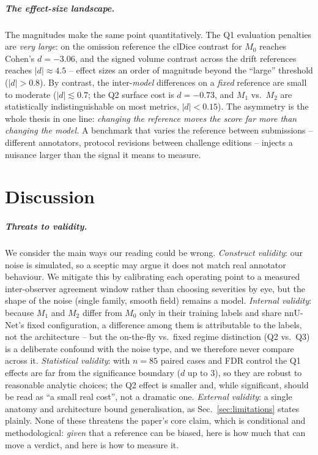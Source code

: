 \documentclass[
    bookmarks, bookmarksnumbered, bookmarksopen,
    colorlinks=true, citecolor=blue, linkcolor=blue, urlcolor=blue
]{techrep}
\begin{document}
\paragraph{The effect-size landscape.} The magnitudes make the same point quantitatively. The
Q1 evaluation penalties are \emph{very large}: on the omission reference the clDice contrast for
$M_0$ reaches Cohen's $d{=}{-}3.06$, and the signed volume contrast across the drift references
reaches $|d|\!\approx\!4.5$ -- effect sizes an order of magnitude beyond the ``large'' threshold
($|d|{>}0.8$). By contrast, the inter-\emph{model} differences on a \emph{fixed} reference are
small to moderate ($|d|\!\lesssim\!0.7$; the Q2 surface cost is $d{=}{-}0.73$, and $M_1$ vs.\
$M_2$ are statistically indistinguishable on most metrics, $|d|{<}0.15$). The asymmetry is the
whole thesis in one line: \emph{changing the reference moves the score far more than changing the
model.} A benchmark that varies the reference between submissions -- different annotators,
protocol revisions between challenge editions -- injects a nuisance larger than the signal it
means to measure.

\chapter{Discussion}\label{sec:discussion}
\paragraph{Threats to validity.} We consider the main ways our reading could be wrong.
\emph{Construct validity}: our noise is simulated, so a sceptic may argue it does not match real
annotator behaviour. We mitigate this by calibrating each operating point to a measured
inter-observer agreement window rather than choosing severities by eye, but the shape of the
noise (single family, smooth field) remains a model. \emph{Internal validity}: because $M_1$ and
$M_2$ differ from $M_0$ only in their training labels and share nnU-Net's fixed configuration, a
difference among them is attributable to the labels, not the architecture -- but the on-the-fly
vs.\ fixed regime distinction (Q2 vs.\ Q3) is a deliberate confound with the noise type, and we
therefore never compare across it. \emph{Statistical validity}: with $n{=}85$ paired cases and
FDR control the Q1 effects are far from the significance boundary ($d$ up to $3$), so they are
robust to reasonable analytic choices; the Q2 effect is smaller and, while significant, should be
read as ``a small real cost'', not a dramatic one. \emph{External validity}: a single anatomy and
architecture bound generalisation, as Sec.~\ref{sec:limitations} states plainly. None of these
threatens the paper's core claim, which is conditional and methodological: \emph{given} that a
reference can be biased, here is how much that can move a verdict, and here is how to measure it.
\end{document}
